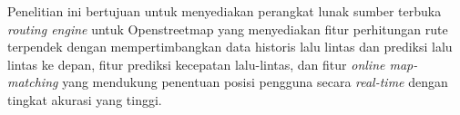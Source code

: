 Penelitian ini bertujuan untuk menyediakan perangkat lunak sumber terbuka \textit{routing engine} untuk Openstreetmap yang menyediakan fitur perhitungan rute terpendek dengan mempertimbangkan data historis lalu lintas dan prediksi lalu lintas ke depan, fitur prediksi kecepatan lalu-lintas, dan fitur \textit{online map-matching} yang mendukung penentuan posisi pengguna secara \textit{real-time} dengan tingkat akurasi yang tinggi. 